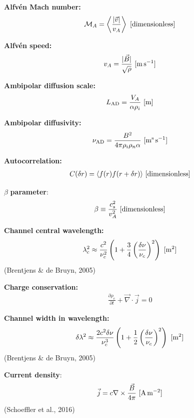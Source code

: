 \documentclass[a4paper,10pt]{article}
\begin{document}
{\noindent}\textbf{Alfv\'en Mach number:}
\begin{align*}
    \mathcal{M}_A = \left\langle\frac{\lvert\vec{v}\rvert}{v_A}\right\rangle ~ [{\rm dimensionless}]
\end{align*}

{\noindent}\textbf{Alfv\'en speed:}
\begin{align*}
    v_A = \frac{\lvert\vec{B}\lvert}{\sqrt{\rho}} ~ [{\rm m\,s^{-1}}]
\end{align*}

{\noindent}\textbf{Ambipolar diffusion scale:}
\begin{align*}
    L_\mathrm{AD} = \dfrac{V_A}{\alpha\rho_i} ~ [\rm m]
\end{align*}

{\noindent}\textbf{Ambipolar diffusivity:}
\begin{align*}
    \nu_\mathrm{AD} = \dfrac{B^2}{4\pi\rho_i\rho_n\alpha} ~ [{\rm m^s\,s^{-1}}]
\end{align*}

{\noindent}\textbf{Autocorrelation:}
\begin{align*}
    C(\delta r) = \langle f(r)f(r+\delta r)\rangle ~ [{\rm dimensionless}]
\end{align*}

{\noindent}$\beta$ \textbf{parameter}: 
\begin{align*}
    \beta \equiv \frac{c_s^2}{v_A^2} ~ [{\rm dimensionless}]
\end{align*}

{\noindent}\textbf{Channel central wavelength:} 
\begin{align*}
\lambda_c^2 \approx \dfrac{c^2}{\nu_c^2} \left(1+\dfrac{3}{4}\left(\dfrac{\delta\nu}{\nu_c}\right)^2\right) ~ [{\rm m^2}]
\end{align*}
(Brentjens \& de Bruyn, 2005)

{\noindent}\textbf{Charge conservation:} 
\begin{align*}
    \frac{\partial\rho_e}{\partial t} + \vec\nabla\cdot\vec{j} = 0
\end{align*}

{\noindent}\textbf{Channel width in wavelength:} 
\begin{align*}
\delta\lambda^2 \approx \dfrac{2c^2\delta\nu}{\nu_c^3} \left(1+\dfrac{1}{2}\left(\dfrac{\delta\nu}{\nu_c}\right)^2\right) ~ [{\rm m^2}]
\end{align*}
(Brentjens \& de Bruyn, 2005)

{\noindent}\textbf{Current density}:
\begin{align*}
    \vec{j} = c\nabla\times\frac{\vec{B}}{4\pi} ~ [{\rm A\,m^{-2}}]
\end{align*}
(Schoeffler et al., 2016)
\end{document}
